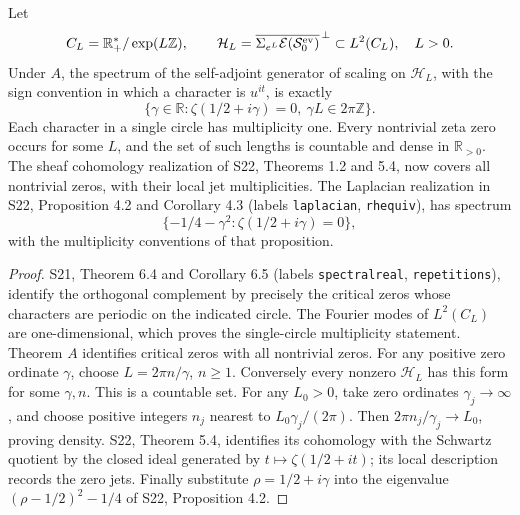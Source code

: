 \begin{proposition}
\label{AC-S01}
Let
\[
 C_L=\mathbb R_+^*/\exp(L\mathbb Z),\qquad
 \mathcal H_L=\overline{\Sigma_{e^L}\mathcal E(\mathcal S_0^{\rm ev})}^{\,\perp}
 \subset L^2(C_L),\quad L>0.
\]
Under \(A\), the spectrum of the self-adjoint generator of scaling on
\(\mathcal H_L\), with the sign convention in which a character is
\(u^{it}\), is exactly
\[
 \{\gamma\in\mathbb R:\zeta(1/2+i\gamma)=0,
                       \ \gamma L\in2\pi\mathbb Z\}.
\]
Each character in a single circle has multiplicity one.  Every nontrivial
zeta zero occurs for some \(L\), and the set of such lengths is countable
and dense in \(\mathbb R_{>0}\).  The sheaf cohomology realization of
S22, Theorems 1.2 and 5.4, now covers all nontrivial zeros, with their
local jet multiplicities.
The Laplacian realization in S22, Proposition 4.2 and Corollary 4.3
(labels \texttt{laplacian}, \texttt{rhequiv}), has spectrum
\[
 \{-1/4-\gamma^2:\zeta(1/2+i\gamma)=0\},
\]
with the multiplicity conventions of that proposition.
\end{proposition}
\begin{proof}
S21, Theorem 6.4 and Corollary 6.5 (labels \texttt{spectralreal},
\texttt{repetitions}), identify the orthogonal complement by precisely
the critical zeros whose characters are periodic on the indicated circle.
The Fourier modes of \(L^2(C_L)\) are one-dimensional, which proves the
single-circle multiplicity statement.  Theorem \(A\) identifies critical
zeros with all nontrivial zeros.  For any positive zero ordinate
\(\gamma\), choose \(L=2\pi n/\gamma\), \(n\geq1\).
Conversely every nonzero \(\mathcal H_L\) has this form for some
\(\gamma,n\).  This is a countable set.  For any \(L_0>0\), take
zero ordinates \(\gamma_j\to\infty\), and choose positive integers
\(n_j\) nearest to \(L_0\gamma_j/(2\pi)\).  Then
\(2\pi n_j/\gamma_j\to L_0\), proving density.
S22, Theorem 5.4, identifies its cohomology with the Schwartz quotient
by the closed ideal generated by \(t\mapsto\zeta(1/2+it)\); its local
description records the zero jets.  Finally substitute
\(\rho=1/2+i\gamma\) into the eigenvalue
\((\rho-1/2)^2-1/4\) of S22, Proposition 4.2.
\end{proof}

